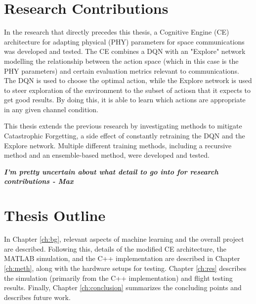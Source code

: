 \section{Research Contributions}
\par In the research that directly precedes this thesis\cite{paulo_thesis}\cite{tim_paper}, a Cognitive Engine (CE) architecture for adapting physical (PHY) parameters for space communications was developed and tested. The CE combines a DQN with an "Explore" network modelling the relationship between the action space (which in this case is the PHY parameters) and certain evaluation metrics relevant to communications. The DQN is used to choose the optimal action, while the Explore network is used to steer exploration of the environment to the subset of actiosn that it expects to get good results. By doing this, it is able to learn which actions are appropriate in any given channel condition.  
\par This thesis extends the previous research by investigating methods to mitigate Catastrophic Forgetting, a side effect of constantly retraining the DQN and the Explore network. Multiple different training methods, including a recursive method and an ensemble-based method, were developed and tested. 
\par \textit{\textbf{ I'm pretty uncertain about what detail to go into for research contributions - Max}}
\section{Thesis Outline}
\par In Chapter \ref{ch:bg}, relevant aspects of machine learning and the overall project are described. Following this, details of the modified CE architecture, the MATLAB simulation, and the C++ implementation are described in Chapter \ref{ch:meth}, along with the hardware setups for testing. Chapter \ref{ch:res} describes the simulation (primarily from the C++ implementation) and flight testing results. Finally, Chapter \ref{ch:conclusion} summarizes the concluding points and describes future work.
